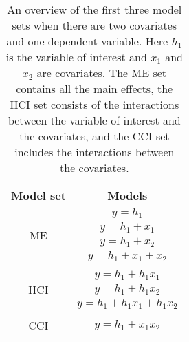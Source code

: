 \begin{table}[]
\caption{}
\caption*{\footnotesize An overview of the first three model sets when there are two covariates and one dependent variable. Here $h_1$ is the variable of interest and $x_1$ and $x_2$ are covariates. The ME set contains all the main effects, the HCI set consists of the interactions between the variable of interest and the covariates, and the CCI set includes the interactions between the covariates.}
\centering
\begin{tabular}{cc}
\toprule
Model set & Models \\ 
\midrule
\multirow{4}{*}{ME} & $y=h_1$ \\ & $y=h_1+x_1$ \\ & $y=h_1+x_2$ \\ & $y=h_1+x_1+x_2$  \\ & \\
\multirow{3}{*}{HCI} & $y=h_1+h_1x_1$ \\ & $y=h_1+h_1x_2$ \\ & $y=h_1+h_1x_1+h_1x_2$  \\& \\
CCI & $y=h_1+x_1x_2$ \\ 
\bottomrule
\end{tabular}
\end{table}


